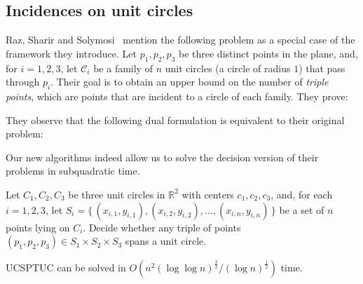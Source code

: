 \subsection{Incidences on unit circles}

Raz, Sharir and Solymosi~\cite{RSS15} mention the following problem as a
special case of the framework they introduce.
Let $p_1,p_2,p_3$ be three distinct points in the plane, and, for $i=1,2,3$,
let $\mathcal{C}_i$ be a family of $n$ unit circles (a circle of radius $1$)
that pass through $p_i$.  Their goal is to obtain an upper bound on the number
of \emph{triple points}, which are points that are incident to a circle of each
family.
%
They prove:


They observe that the following dual formulation is equivalent to their
original problem:


Our new algorithms indeed allow us to solve the decision version of their
problems in subquadratic time.
\begin{problem}
	Let $C_1,C_2,C_3$ be three unit circles in $\mathbb{R}^2$ with centers
	$c_1,c_2,c_3$, and, for each $i=1,2,3$, let $S_i =
	\{\,(x_{i,1},y_{i,1}),(x_{i,2},y_{i,2}),\ldots,(x_{i,n},y_{i,n})\,\}$ be a
	set of $n$ points lying on $C_i$. Decide whether any triple of points
	$(p_1,p_2,p_3) \in S_1 \times S_2 \times S_3$ spans a unit circle.
\end{problem}

\begin{theorem}
	UCSPTUC can be solved in
	$O(n^2 {(\log \log n)}^\frac{3}{2} / {(\log n)}^\frac{1}{2})$ time.
\end{theorem}

